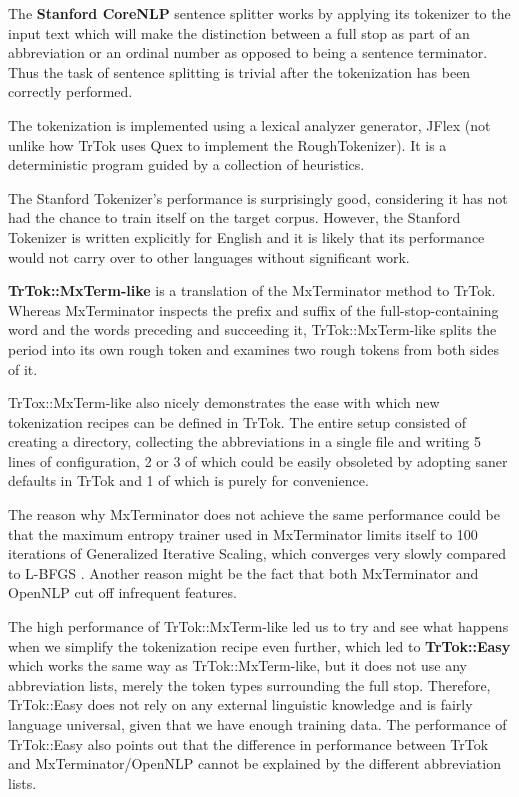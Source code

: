 The \textbf{Stanford CoreNLP} sentence splitter works by applying its
tokenizer to the input text which will make the distinction between a
full stop as part of an abbreviation or an ordinal number as opposed
to being a sentence terminator. Thus the task of sentence splitting is
trivial after the tokenization has been correctly performed.

The tokenization is implemented using a lexical analyzer generator,
JFlex (not unlike how TrTok uses Quex to implement the
RoughTokenizer). It is a deterministic program guided by a collection
of heuristics.

The Stanford Tokenizer's performance is surprisingly good, considering
it has not had the chance to train itself on the target corpus.
However, the Stanford Tokenizer is written explicitly for English and
it is likely that its performance would not carry over to other
languages without significant work.

\textbf{TrTok::MxTerm-like} is a translation of the MxTerminator
method to TrTok. Whereas MxTerminator inspects the prefix and suffix
of the full-stop-containing word and the words preceding and
succeeding it, TrTok::MxTerm-like splits the period into its own rough
token and examines two rough tokens from both sides of it.

TrTox::MxTerm-like also nicely demonstrates the ease with which new
tokenization recipes can be defined in TrTok. The entire setup
consisted of creating a directory, collecting the abbreviations in a
single file and writing 5 lines of configuration, 2 or 3 of which
could be easily obsoleted by adopting saner defaults in TrTok and 1 of
which is purely for convenience.

The reason why MxTerminator does not achieve the same performance
could be that the maximum entropy trainer used in MxTerminator limits
itself to 100 iterations of Generalized Iterative Scaling, which
converges very slowly compared to L-BFGS \cite{maxent-algorithms}.
Another reason might be the fact that both MxTerminator and OpenNLP
cut off infrequent features.

The high performance of TrTok::MxTerm-like led us to try and see what
happens when we simplify the tokenization recipe even further, which
led to \textbf{TrTok::Easy} which works the same way as
TrTok::MxTerm-like, but it does not use any abbreviation lists, merely
the token types surrounding the full stop. Therefore, TrTok::Easy does
not rely on any external linguistic knowledge and is fairly language
universal, given that we have enough training data. The performance of
TrTok::Easy also points out that the difference in performance between
TrTok and MxTerminator/OpenNLP cannot be explained by the different
abbreviation lists.

